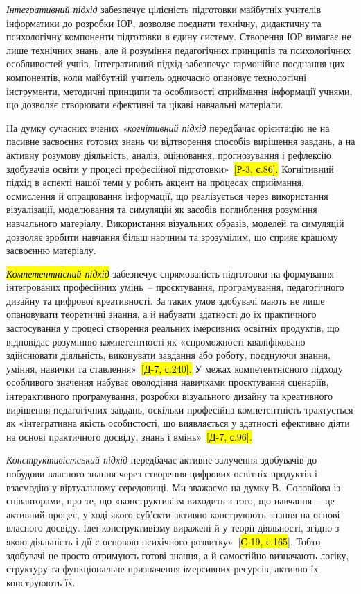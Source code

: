 \emph{Інтегративний підхід} забезпечує цілісність підготовки майбутніх учителів інформатики до розробки ІОР, дозволяє поєднати технічну, дидактичну та психологічну компоненти підготовки в єдину систему. Створення ІОР вимагає не лише технічних знань, але й розуміння педагогічних принципів та психологічних особливостей учнів. Інтегративний підхід забезпечує гармонійне поєднання цих компонентів, коли майбутній учитель одночасно опановує технологічні інструменти, методичні принципи та особливості сприймання інформації учнями, що дозволяє створювати ефективні та цікаві навчальні матеріали.

На думку сучасних вчених \emph{«когнітивний підхід} передбачає орієнтацію не на пасивне засвоєння готових знань чи відтворення способів вирішення завдань, а на активну розумову діяльність, аналіз, оцінювання, прогнозування і рефлексію здобувачів освіти у процесі професійної підготовки»~\hl{{[}Р-3, с.86{]}.} Когнітивний підхід в аспекті нашої теми у робить акцент на процесах сприймання, осмислення й опрацювання інформації, що реалізується через використання візуалізації, моделювання та симуляцій як засобів поглиблення розуміння навчального матеріалу. Використання візуальних образів, моделей та симуляцій дозволяє зробити навчання більш наочним та зрозумілим, що сприяє кращому засвоєнню матеріалу.

\emph{\hl{Компетентнісний підхід}} забезпечує спрямованість підготовки на формування інтегрованих професійних умінь~-- проєктування, програмування, педагогічного дизайну та цифрової креативності. За таких умов здобувачі мають не лише опановувати теоретичні знання, а й набувати здатності до їх практичного застосування у процесі створення реальних імерсивних освітніх продуктів, що відповідає розумінню компетентності як \textbf{«}спроможності кваліфіковано здійснювати діяльність, виконувати завдання або роботу, поєднуючи знання, уміння, навички та ставлення»~\hl{{[}Д-7, с.240{]}.} У межах компетентнісного підходу особливого значення набуває оволодіння навичками проєктування сценаріїв, інтерактивного програмування, розробки візуального дизайну та креативного вирішення педагогічних завдань, оскільки професійна компетентність трактується як «інтегративна якість особистості, що виявляється у здатності ефективно діяти на основі практичного досвіду, знань і вмінь»~\hl{{[}Д-7, с.96{]}.}

\emph{Конструктивістський підхід} передбачає активне залучення здобувачів до побудови власного знання через створення цифрових освітніх продуктів і взаємодію у віртуальному середовищі. Ми зважаємо на думку В.~Соловйова із співавторами, про те, що «конструктивізм виходить з того, що навчання~-- це активний процес, у ході якого суб'єкти активно конструюють знання на основі власного досвіду. Ідеї конструктивізму виражені й у теорії діяльності, згідно з якою діяльність і дії є основою психічного розвитку»~{[}\hl{С-19, с.165}{]}. Тобто здобувачі не просто отримують готові знання, а й самостійно визначають логіку, структуру та функціональне призначення імерсивних ресурсів, активно їх конструюють їх.

